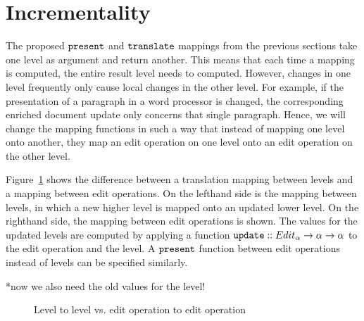 





%																
\section{Incrementality}

The proposed ${\tt present}$ and ${\tt translate}$ mappings from the previous sections take one level as argument and return another. This means that each time a mapping is computed, the entire result level needs to computed. However, changes in one level frequently only cause local changes in the other level. For example, if the presentation of a paragraph in a word processor is changed, the corresponding enriched document update only concerns that single paragraph. Hence, we will change the mapping functions in such a way that instead of mapping one level onto another, they map an edit operation on one level onto an edit operation on the other level. 

Figure~\ref{fromLevelToOp} shows the difference between a translation mapping between levels and a mapping between edit operations. On the lefthand side is the mapping between levels, in which a new higher level is mapped onto an updated lower level. On the righthand side, the mapping between edit operations is shown. The values for the updated levels are computed by applying a function
 ${\tt update} :: Edit_\alpha \rightarrow \alpha \rightarrow \alpha$ to the edit operation and the level. A 
 ${\tt present}$ function between edit operations instead of levels can be specified similarly.

*now we also need the old values for the level!

\begin{figure}
\begin{small}
\begin{center}
\begin{center}
\end{center}\caption{Level to level vs. edit operation to edit operation }\label{fromLevelToOp} 
\end{center}
\end{small}
\end{figure}



